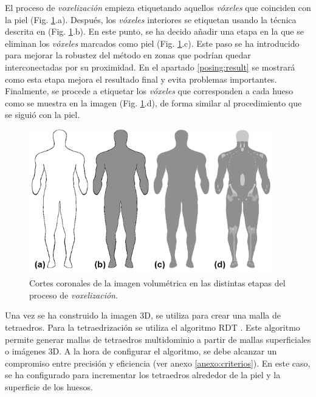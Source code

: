 El proceso de \emph{voxelización} empieza etiquetando aquellos \emph{vóxeles} que coinciden con la piel (Fig. \ref{fig:voxelizacion}.a). Después, los \emph{vóxeles} interiores se etiquetan usando la técnica descrita en \cite{SUZUKI20031} (Fig. \ref{fig:voxelizacion}.b).
En este punto, se ha decido añadir una etapa en la que se eliminan los \emph{vóxeles} marcados como piel (Fig. \ref{fig:voxelizacion}.c). %
Este paso se ha introducido para mejorar la robustez del método en zonas que podrían quedar interconectadas por su proximidad. 
En el apartado \ref{posing:result} se mostrará como esta etapa mejora el resultado final y evita problemas importantes. Finalmente, se procede a etiquetar los \emph{vóxeles} que corresponden a cada hueso como se muestra en la imagen (Fig. \ref{fig:voxelizacion}.d), de forma similar al procedimiento que se siguió con la piel. 
%
%
\begin{figure}[th]
   \centering
    \includegraphics[width=0.95\textwidth]{IMG/Volume2.png}
    \caption{
    Cortes coronales de la imagen volumétrica en las distintas etapas del proceso de \emph{voxelización}.}
\label{fig:voxelizacion}
\end{figure}

Una vez se ha construido la imagen 3D, se utiliza para crear una malla de tetraedros. Para la tetraedrización se utiliza el algoritmo \ac{RDT} \cite{jamin:hal-00796052}. Este algoritmo permite generar mallas de tetraedros multidominio a partir de mallas superficiales o imágenes 3D. A la hora de configurar el algoritmo, se debe alcanzar un compromiso entre precisión y eficiencia (ver anexo \ref{anexo:criterios}). En este caso, se ha configurado para incrementar los tetraedros alrededor de la piel y la superficie de los huesos. 

